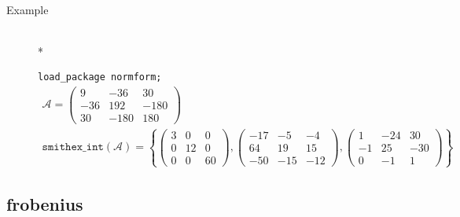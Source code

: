 \begin{description}
\item[Example]\mbox{}\\*

\texttt{load\_package normform;}
\begin{gather*}
 \mathcal{A} =
    \begin{pmatrix} 9 & -36 & 30 \\ -36 & 192 & -180 \\ 30 & -180 & 180 \end{pmatrix} \\[2mm]
\mathtt{smithex\_int}(\mathcal{A}) = 
\left\{ \begin{pmatrix} 3 & 0 & 0 \\ 0 & 12 & 0 \\ 0 & 0 & 60 \end{pmatrix},
        \begin{pmatrix} -17 & -5 & -4 \\ 64 & 19 & 15 \\ -50 & -15 & -12 \end{pmatrix},
        \begin{pmatrix} 1 & -24 & 30 \\ -1 & 25 & -30 \\ 0 & -1 & 1 \end{pmatrix} \right\}
\end{gather*}
\end{description}

\subsection{frobenius}

